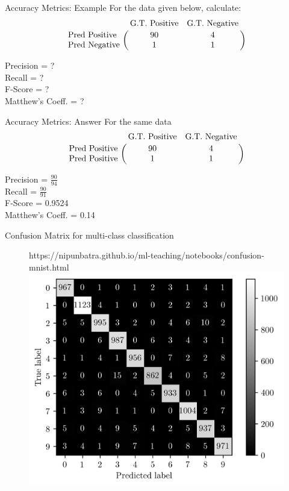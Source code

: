 \documentclass[usenames,dvipsnames]{beamer}
\begin{document}
\begin{frame}{Accuracy Metrics: Example}
For the data given below, calculate: 
$$
\bordermatrix{&\text{G.T. Positive}&\text{G.T. Negative}\cr
               \text{Pred Positive}&90&4\cr
               \text{Pred Negative}&1&1}
$$

Precision = ?  \\
Recall = ?\\
F-Score = ?\\
Matthew's Coeff. = ?\\
\end{frame}

\begin{frame}{Accuracy Metrics: Answer}
For the same data
$$
\bordermatrix{&\text{G.T. Positive}&\text{G.T. Negative}\cr
               \text{Pred Positive}&90&4\cr
               \text{Pred Positive}&1&1}
$$

Precision = $\frac{90}{94}$ \\
Recall = $\frac{90}{91}$ \\
F-Score = 0.9524 \\
Matthew's Coeff. = 0.14
\end{frame}


\begin{frame}{Confusion Matrix for multi-class classification}
	\begin{figure}[htp]
		\centering
		\begin{notebookbox}{https://nipunbatra.github.io/ml-teaching/notebooks/confusion-mnist.html}
		  \includegraphics[scale=0.6]{../figures/mnist-cm.png}
		\end{notebookbox}
	  \end{figure}
	
\end{frame}
\end{document}

